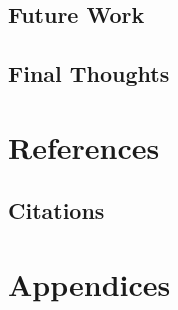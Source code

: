 \documentclass[12pt,oneside,a4paper]{article}
\begin{document}
\subsection{Future Work}

\subsection{Final Thoughts}


\section{References} 

\subsection{Citations}


\section{Appendices}


\end{document}

